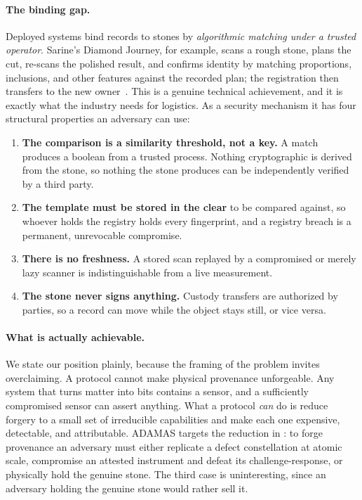 \documentclass[10pt,twocolumn]{article}
\theoremstyle{remark}
\begin{document}
\paragraph{The binding gap.} Deployed systems bind records to stones by
\emph{algorithmic matching under a trusted operator}. Sarine's Diamond Journey,
for example, scans a rough stone, plans the cut, re-scans the polished result,
and confirms identity by matching proportions, inclusions, and other features
against the recorded plan; the registration then transfers to the new
owner~\cite{sarine_journey,sarine_tech}. This is a genuine technical
achievement, and it is exactly what the industry needs for logistics. As a
security mechanism it has four structural properties an adversary can use:

\begin{enumerate}
\item \textbf{The comparison is a similarity threshold, not a key.} A match
produces a boolean from a trusted process. Nothing cryptographic is derived from
the stone, so nothing the stone produces can be independently verified by a
third party.
\item \textbf{The template must be stored in the clear} to be compared against,
so whoever holds the registry holds every fingerprint, and a registry breach is
a permanent, unrevocable compromise.
\item \textbf{There is no freshness.} A stored scan replayed by a compromised or
merely lazy scanner is indistinguishable from a live measurement.
\item \textbf{The stone never signs anything.} Custody transfers are authorized
by parties, so a record can move while the object stays still, or vice versa.
\end{enumerate}

\paragraph{What is actually achievable.} We state our position plainly, because
the framing of the problem invites overclaiming. A protocol cannot make physical
provenance unforgeable. Any system that turns matter into bits contains a sensor,
and a sufficiently compromised sensor can assert anything. What a protocol
\emph{can} do is reduce forgery to a small set of irreducible capabilities and
make each one expensive, detectable, and attributable. ADAMAS targets the
reduction in : to forge provenance an adversary must either
replicate a defect constellation at atomic scale, compromise an attested
instrument and defeat its challenge-response, or physically hold the genuine
stone. The third case is uninteresting, since an adversary holding the genuine
stone would rather sell it.
\end{document}
